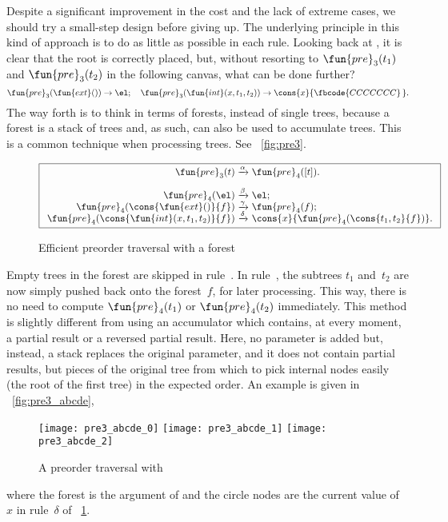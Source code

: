 Despite a significant improvement in the cost and the lack of extreme
cases, we should try a small\hyp{}step design before giving up. The underlying principle in this kind of
approach is to do as little as possible in each rule. Looking back at
, it is clear that the
root is correctly placed, but, without resorting to
\(\fun{pre}_3(t_1)\) and
\(\fun{pre}_3(t_2)\) in the following canvas, what can be done
further?
\begin{equation*}
\fun{pre}_3(\fun{ext}()) \rightarrow \el;
\quad
\fun{pre}_3(\fun{int}(x,t_1,t_2)) \rightarrow
  \cons{x}{\fbcode{CCCCCCC}\,}.
\end{equation*}
The way forth is to think in terms of forests,
instead of single trees, because a forest is a stack of trees and, as
such, can also be used to accumulate trees. This is a common technique when processing
trees. See \fig~\vref{fig:pre3}.
\begin{figure}
\begin{equation*}
\boxed{
\begin{array}{r@{\;}c@{\;}l}
\fun{pre}_3(t) & \xrightarrow{\smash{\alpha}} & \fun{pre}_4([t]).\\
\\
\fun{pre}_4(\el) & \xrightarrow{\smash{\beta}} & \el;\\
\fun{pre}_4(\cons{\fun{ext}()}{f})
  & \xrightarrow{\smash{\gamma}} & \fun{pre}_4(f);\\
\fun{pre}_4(\cons{\fun{int}(x,t_1,t_2)}{f})
  & \xrightarrow{\smash{\delta}} &
  \cons{x}{\fun{pre}_4(\cons{t_1,t_2}{f})}.
\end{array}}
\end{equation*}
\caption{Efficient preorder traversal with a forest}
\label{fig:pre3}
\end{figure}
Empty trees in the forest are skipped in rule~\clause{\gamma}. In
rule~\clause{\delta}, the subtrees \(t_1\) and~\(t_2\) are now simply
pushed back onto the forest~\(f\), for later processing. This way,
there is no need to compute
\(\fun{pre}_4(t_1)\) or
\(\fun{pre}_4(t_2)\) immediately. This method is slightly different
from using an accumulator which contains, at every moment, a partial
result or a reversed partial result. Here, no parameter is added but,
instead, a stack replaces the original parameter, and it does not
contain partial results, but pieces of the original tree from which to
pick internal nodes easily (the root of the first tree) in the
expected order. An example is given in \fig~\vref{fig:pre3_abcde},
\begin{figure}[!t]
\centering
\texttt{[image: pre3\_abcde\_0]} %
\texttt{[image: pre3\_abcde\_1]}
\texttt{[image: pre3\_abcde\_2]}
\caption{A preorder traversal with }
\label{fig:pre3_abcde}
\end{figure}
where the forest is the argument of  and the circle
nodes are the current value of~\(x\) in rule~\(\delta\) of
\fig~\ref{fig:pre3}.

